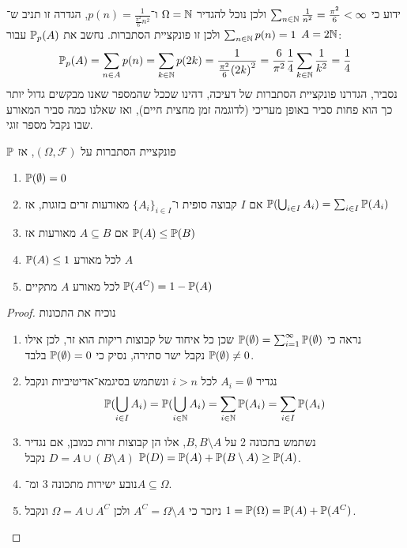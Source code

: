 \begin{example}
	ידוע כי $\sum_{n \in \mathbb{N}} \frac{1}{n^2} = \frac{\pi^2}{6} < \infty$ ולכן נוכל להגדיר $\Omega = \mathbb{N}$ ו־$p(n) = \frac{1}{\frac{\pi^2}{6} n^2}$, הגדרה זו תניב ש־$\sum_{n \in \mathbb{N}} p(n) = 1$ ולכן זו פונקציית הסתברות.
	נחשב את $\mathbb{P}_p(A)$ עבור $A = 2\mathbb{N}$:
	\[
		\mathbb{P}_p(A) = \sum_{n \in A} p(n) = \sum_{k \in \mathbb{N}} p(2k) = \frac{1}{\frac{\pi^2}{6} {(2k)}^2} = \frac{6}{\pi^2} \frac{1}{4} \sum_{k \in \mathbb{N}} \frac{1}{k^2} = \frac{1}{4}
	\]
	נסביר, הגדרנו פונקציית הסתברות של דעיכה, דהינו שככל שהמספר שאנו מבקשים גדול יותר כך הוא פחות סביר באופן מעריכי (לדוגמה זמן מחצית חיים), ואז שאלנו כמה סביר המאורע שבו נקבל מספר זוגי.
\end{example}
\begin{theorem}
	$\mathbb{P}$ פונקציית הסתברות על $(\Omega, \mathcal{F})$, אז
	\begin{enumerate}
		\item $\mathbb{P}(\emptyset) = 0$
		\item אם $I$ קבוצה סופית ו־${\{A_i\}}_{i \in I}$ מאורעות זרים בזוגות, אז $\mathbb{P}(\bigcup_{i \in I} A_i) = \sum_{i \in I} \mathbb{P}(A_i)$
		\item אם $A \subseteq B$ מאורעות אז $\mathbb{P}(A) \le \mathbb{P}(B)$
		\item $\mathbb{P}(A) \le 1$ לכל מאורע $A$
		\item לכל מאורע $A$ מתקיים $\mathbb{P}(A^C) = 1 - \mathbb{P}(A)$
	\end{enumerate}
\end{theorem}
\begin{proof}
	נוכיח את התכונות
	\begin{enumerate}
		\item נראה כי $\mathbb{P}(\emptyset) = \sum_{i = 1}^\infty \mathbb{P}(\emptyset)$ שכן כל איחוד של קבוצות ריקות הוא זר, לכן אילו $\mathbb{P}(\emptyset) \ne 0$ נקבל ישר סתירה, נסיק כי $\mathbb{P}(\emptyset) = 0$ בלבד.
		\item נגדיר $A_i = \emptyset$ לכל $i > n$ ונשתמש בסיגמא־אדיטיביות ונקבל
			\[
				\mathbb{P}(\bigcup_{i \in I} A_i)
				= \mathbb{P}(\bigcup_{i \in \mathbb{N}} A_i)
				= \sum_{i \in \mathbb{N}} \mathbb{P}(A_i)
				= \sum_{i \in I} \mathbb{P}(A_i)
			\]
		\item נשתמש בתכונה 2 על $B, B \setminus A$, אלו הן קבוצות זרות כמובן, אם נגדיר $D = A \cup (B \setminus A)$ נקבל $\mathbb{P}(D) = \mathbb{P}(A) + \mathbb{P}(B \setminus A) \ge \mathbb{P}(A)$.
		\item נובע ישירות מתכונה 3 ומ־$A \subseteq \Omega$.
		\item ניזכר כי $A^C = \Omega \setminus A$ ולכן $\Omega = A \cup A^C$ ונקבל $1 = \mathbb{P}(\Omega) = \mathbb{P}(A) + \mathbb{P}(A^C)$.
	\end{enumerate}
\end{proof}
